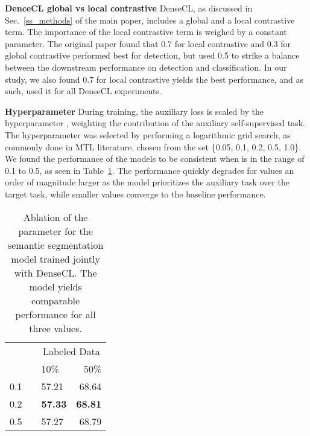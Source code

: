 \documentclass[10pt,twocolumn,letterpaper]{article}
\newcommand{\parsection}[1]{\vspace{1mm}\noindent\textbf{#1 }}
\begin{document}
\parsection{DenceCL global vs local contrastive}
DenseCL, as discussed in 
Sec.~\ref{ss_methods}
of the main paper, includes a global and a local contrastive term. The importance of the local contrastive term is weighed by a constant parameter. The original paper found that 0.7 for local contrastive and 0.3 for global contrastive performed best for detection, but used 0.5 to strike a balance between the downstream performance on detection and classification. In our study, we also found 0.7 for local contrastive yields the best performance, and as such, used it for all DenseCL experiments.

\parsection{Hyperparameter }
During training, the auxiliary loss is scaled by the hyperparameter , weighting the contribution of the auxiliary self-supervised task.
The hyperparameter  was selected by performing a logarithmic grid search, as commonly done in MTL literature, chosen from the set \{0.05, 0.1, 0.2, 0.5, 1.0\}.
We found the performance of the models to be consistent when  is in the range of 0.1 to 0.5, as seen in Table~\ref{table:sup_semseg_lambda}.
The performance quickly degrades for values an order of magnitude larger as the model prioritizes the auxiliary task over the target task, while smaller values converge to the baseline performance.

\begin{table}[h]
  \centering
   \caption{Ablation of the  parameter for the semantic segmentation model trained jointly with DenseCL. The model yields comparable performance for all three values.}
\footnotesize
  \begin{tabularx}{0.4\linewidth}{@{}lcXr@{}}
    \toprule
\multirow{2}{*}{} &&    \multicolumn{2}{c}{Labeled Data} \\
    \cmidrule{2-4} 
    && 10\% & 50\% \\
    \midrule
    
	0.1  && 57.21  & 68.64 \\
	0.2 && \textbf{57.33} & \textbf{68.81} \\
	0.5 && 57.27 & 68.79 \\
    \bottomrule
  \end{tabularx}
\label{table:sup_semseg_lambda}
\vspace{4.3in}
\end{table}
 

{\small


}
\end{document}
